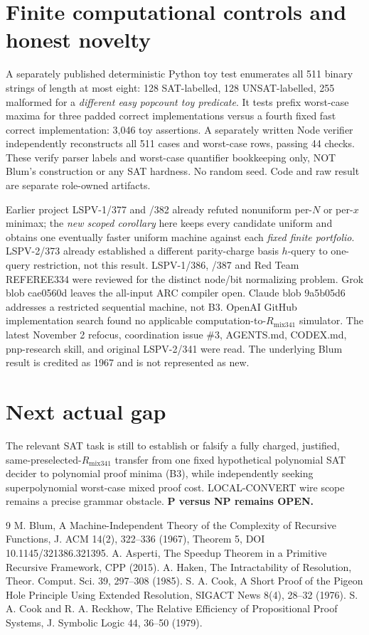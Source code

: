 \documentclass[11pt]{article}
\begin{document}
\section*{Finite computational controls and honest novelty}
A separately published deterministic Python toy test enumerates all 511 binary strings of length at most eight: 128 SAT-labelled, 128 UNSAT-labelled, 255 malformed for a \emph{different easy popcount toy predicate}. It tests prefix worst-case maxima for three padded correct implementations versus a fourth fixed fast correct implementation: 3,046 toy assertions. A separately written Node verifier independently reconstructs all 511 cases and worst-case rows, passing 44 checks. These verify parser labels and worst-case quantifier bookkeeping only, NOT Blum's construction or any SAT hardness. No random seed. Code and raw result are separate role-owned artifacts.

Earlier project LSPV-1/377 and /382 already refuted nonuniform per-$N$ or per-$x$ minimax; the \emph{new scoped corollary} here keeps every candidate uniform and obtains one eventually faster uniform machine against each \emph{fixed finite portfolio}. LSPV-2/373 already established a different parity-charge basis $h$-query to one-query restriction, not this result. LSPV-1/386, /387 and Red Team REFEREE334 were reviewed for the distinct node/bit normalizing problem. Grok  blob cae0560d leaves the all-input ARC compiler open. Claude  blob 9a5b05d6 addresses a restricted sequential machine, not B3. OpenAI GitHub implementation search found no applicable computation-to-$R_{\mathrm{mix341}}$ simulator. The latest November 2 refocus, coordination issue \#3, AGENTS.md, CODEX.md, pnp-research skill, and original LSPV-2/341 were read. The underlying Blum result is credited as 1967 and is not represented as new.

\section*{Next actual gap}
The relevant SAT task is still to establish or falsify a fully charged, justified, same-preselected-$R_{\mathrm{mix341}}$ transfer from one fixed hypothetical polynomial SAT decider to polynomial proof minima (B3), while independently seeking superpolynomial worst-case mixed proof cost. LOCAL-CONVERT wire scope remains a precise grammar obstacle. \textbf{P versus NP remains OPEN.}

\begin{thebibliography}{9}
 M. Blum, A Machine-Independent Theory of the Complexity of Recursive Functions, J. ACM 14(2), 322--336 (1967), Theorem 5, DOI 10.1145/321386.321395.
 A. Asperti, The Speedup Theorem in a Primitive Recursive Framework, CPP (2015).
 A. Haken, The Intractability of Resolution, Theor. Comput. Sci. 39, 297--308 (1985).
 S. A. Cook, A Short Proof of the Pigeon Hole Principle Using Extended Resolution, SIGACT News 8(4), 28--32 (1976).
 S. A. Cook and R. A. Reckhow, The Relative Efficiency of Propositional Proof Systems, J. Symbolic Logic 44, 36--50 (1979).
\end{thebibliography}
\end{document}
